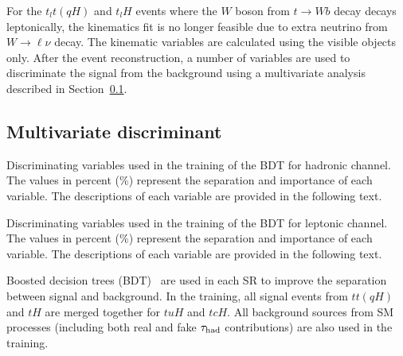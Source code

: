 For the  $t_lt(qH)$ and $t_lH$ events where the $W$ boson from $t\to W b$ decay decays leptonically,
the kinematics fit is no longer feasible due to extra neutrino from $W\rightarrow \ell\nu$ decay. The kinematic variables are calculated using the visible
objects only. After the event reconstruction, a number of variables are used to discriminate the signal from the background using a multivariate analysis described
in Section~\ref{sec:tmva}.



\subsection{Multivariate discriminant}
\label{sec:tmva}

\begin{table}[t!]
  \caption{\small{Discriminating variables used in the training of the BDT for hadronic channel.
      The values in percent (\%) represent the separation and importance of each variable.
    The descriptions of each variable are provided in the following text.}}
\label{tab:importance_xTFW}

\end{table}

\begin{table}[t!]
  \caption{\small{Discriminating variables used in the training of the BDT for leptonic channel.
      The values in percent (\%) represent the separation and importance of each variable.
    The descriptions of each variable are provided in the following text.}}
\label{tab:importance_tthML}

\end{table}

Boosted decision trees (BDT)~\cite{Hocker:2007ht} are used in each SR to improve the separation between signal and background. 
In the training, all signal events from $tt(qH)$ and $tH$ are merged together for $tuH$ and $tcH$. All background sources from SM processes
(including both real and fake $\tau_{\mathrm{had}}$ contributions) are also used in the training.

